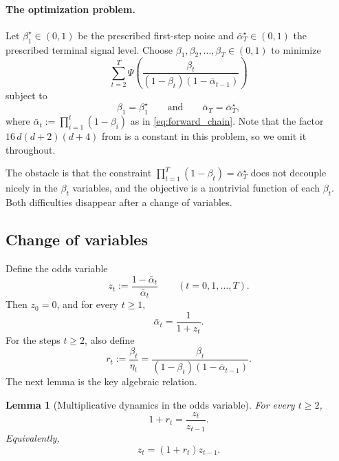 \documentclass[11pt]{article}
\newcommand{\PsiFn}{\Psi}
\newtheorem{lemma}{Lemma}
\begin{document}
\paragraph{The optimization problem.} Let \(\beta_1^\star\in(0,1)\) be the prescribed first-step noise and \(\bar\alpha_T^\star\in(0,1)\) the prescribed terminal signal level. Choose \(\beta_1,\beta_2,\dots,\beta_T\in(0,1)\) to minimize
\begin{equation}
\label{eq:bulk_optimization_problem}
\sum_{t=2}^T \PsiFn\!\left(\frac{\beta_t}{(1-\beta_t)(1-\bar\alpha_{t-1})}\right)
\end{equation}
subject to
\[
\beta_1 = \beta_1^\star
\qquad\text{and}\qquad
\bar\alpha_T = \bar\alpha_T^\star,
\]
where \(\bar\alpha_t := \prod_{i=1}^t(1-\beta_i)\) as in \eqref{eq:forward_chain}. Note that the factor \(16\,d(d+2)(d+4)\) from  is a constant in this problem, so we omit it throughout. 

The obstacle is that the constraint \(\prod_{t=1}^T(1-\beta_t)=\bar\alpha_T^\star\) does not decouple nicely in the \(\beta_t\) variables, and the objective is a nontrivial function of each \(\beta_t\). Both difficulties disappear after a change of variables.

\subsection{Change of variables}

Define the odds variable
\[
z_t := \frac{1-\bar\alpha_t}{\bar\alpha_t}
\qquad (t=0,1,\dots,T).
\]
Then \(z_0=0\), and for every \(t\ge 1\),
\[
\bar\alpha_t = \frac{1}{1+z_t}.
\]
For the steps \(t\ge 2\), also define
\begin{equation}
\label{eq:r_t_def}
r_t := \frac{\beta_t}{\eta_t} = \frac{\beta_t}{(1-\beta_t)(1-\bar\alpha_{t-1})}.
\end{equation}
The next lemma is the key algebraic relation.

\begin{lemma}[Multiplicative dynamics in the odds variable]
\label{lem:odds_dynamics}
For every \(t\ge 2\),
\begin{equation}
\label{eq:odds_dynamics}
1+r_t = \frac{z_t}{z_{t-1}}.
\end{equation}
Equivalently,
\begin{equation}
\label{eq:z_recursion}
z_t = (1+r_t)z_{t-1}.
\end{equation}
\end{lemma}
\end{document}
